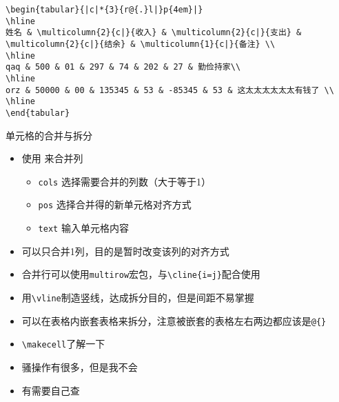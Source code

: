\begin{frame}[fragile]
\begin{lstlisting}
\begin{tabular}{|c|*{3}{r@{.}l|}p{4em}|}
\hline
姓名 & \multicolumn{2}{c|}{收入} & \multicolumn{2}{c|}{支出} & \multicolumn{2}{c|}{结余} & \multicolumn{1}{c|}{备注} \\
\hline
qaq & 500 & 01 & 297 & 74 & 202 & 27 & 勤俭持家\\
\hline
orz & 50000 & 00 & 135345 & 53 & -85345 & 53 & 这太太太太太太有钱了 \\
\hline
\end{tabular}
\end{lstlisting}
\end{frame}
\begin{frame}[fragile]{单元格的合并与拆分}
	\begin{itemize}
		\item 使用 \cprotect{} 来合并列
		\begin{itemize}
			\item \texttt{cols} 选择需要合并的列数（大于等于1）
			\item \texttt{pos} 选择合并得的新单元格对齐方式
			\item \texttt{text} 输入单元格内容
		\end{itemize}
		\item 可以只合并1列，目的是暂时改变该列的对齐方式
		\item 合并行可以使用\texttt{multirow}宏包，与\verb|\cline{i=j}|配合使用
		\item 用\verb|\vline|制造竖线，达成拆分目的，但是间距不易掌握
		\item 可以在表格内嵌套表格来拆分，注意被嵌套的表格左右两边都应该是\texttt{@\{\}}
		\item \verb|\makecell|了解一下
		\item 骚操作有很多，但是我不会
		\item 有需要自己查
	\end{itemize}
\end{frame}

